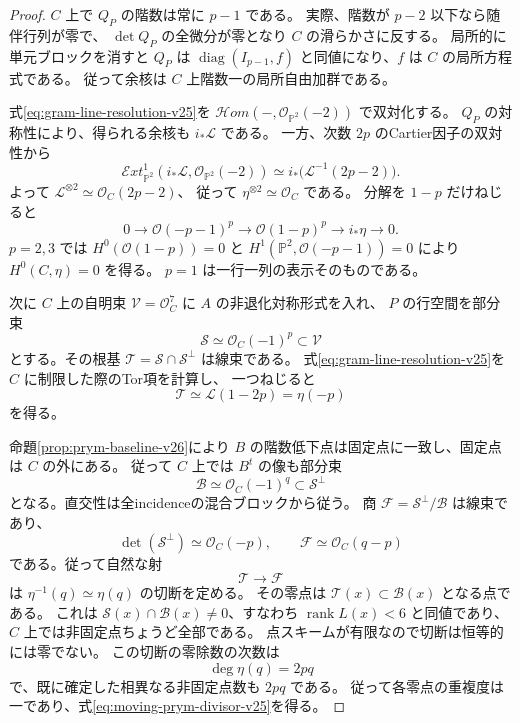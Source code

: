\begin{proof}
$C$ 上で $Q_P$ の階数は常に $p-1$ である。
実際、階数が $p-2$ 以下なら随伴行列が零で、
$\det Q_P$ の全微分が零となり $C$ の滑らかさに反する。
局所的に単元ブロックを消すと $Q_P$ は
$\operatorname{diag}(I_{p-1},f)$ と同値になり、$f$ は $C$ の局所方程式である。
従って余核は $C$ 上階数一の局所自由加群である。

式\eqref{eq:gram-line-resolution-v25}を
$\mathcal H om(-,\mathcal O_{\mathbb P^2}(-2))$ で双対化する。
$Q_P$ の対称性により、得られる余核も $i_*\mathcal L$ である。
一方、次数 $2p$ のCartier因子の双対性から
\[
 \mathcal E xt^1_{\mathbb P^2}
 (i_*\mathcal L,\mathcal O_{\mathbb P^2}(-2))
 \simeq i_*\bigl(\mathcal L^{-1}(2p-2)\bigr).
\]
よって $\mathcal L^{\otimes2}\simeq\mathcal O_C(2p-2)$、
従って $\eta^{\otimes2}\simeq\mathcal O_C$ である。
分解を $1-p$ だけねじると
\[
 0\longrightarrow\mathcal O(-p-1)^p
 \longrightarrow\mathcal O(1-p)^p
 \longrightarrow i_*\eta\longrightarrow0.
\]
$p=2,3$ では $H^0(\mathcal O(1-p))=0$ と
$H^1(\mathbb P^2,\mathcal O(-p-1))=0$ により $H^0(C,\eta)=0$ を得る。
$p=1$ は一行一列の表示そのものである。

次に $C$ 上の自明束 $\mathcal V=\mathcal O_C^7$ に $A$ の非退化対称形式を入れ、
$P$ の行空間を部分束
\[
 \mathcal S\simeq\mathcal O_C(-1)^p\subset\mathcal V
\]
とする。その根基 $\mathcal T=\mathcal S\cap\mathcal S^\perp$ は線束である。
式\eqref{eq:gram-line-resolution-v25}を $C$ に制限した際のTor項を計算し、
一つねじると
\[
 \mathcal T\simeq\mathcal L(1-2p)=\eta(-p)
\]
を得る。

命題\ref{prop:prym-baseline-v26}により $B$ の階数低下点は固定点に一致し、固定点は $C$ の外にある。
従って $C$ 上では $B^t$ の像も部分束
\[
 \mathcal B\simeq\mathcal O_C(-1)^q\subset\mathcal S^\perp
\]
となる。直交性は全incidenceの混合ブロックから従う。
商 $\mathcal F=\mathcal S^\perp/\mathcal B$ は線束であり、
\[
 \det(\mathcal S^\perp)\simeq\mathcal O_C(-p),\qquad
 \mathcal F\simeq\mathcal O_C(q-p)
\]
である。従って自然な射
\[
 \mathcal T\longrightarrow\mathcal F
\]
は $\eta^{-1}(q)\simeq\eta(q)$ の切断を定める。
その零点は $\mathcal T(x)\subset\mathcal B(x)$ となる点である。
これは $\mathcal S(x)\cap\mathcal B(x)\ne0$、すなわち
$\operatorname{rank}L(x)<6$ と同値であり、$C$ 上では非固定点ちょうど全部である。
点スキームが有限なので切断は恒等的には零でない。
この切断の零除数の次数は
\[
 \deg\eta(q)=2pq
\]
で、既に確定した相異なる非固定点数も $2pq$ である。
従って各零点の重複度は一であり、式\eqref{eq:moving-prym-divisor-v25}を得る。
\end{proof}

